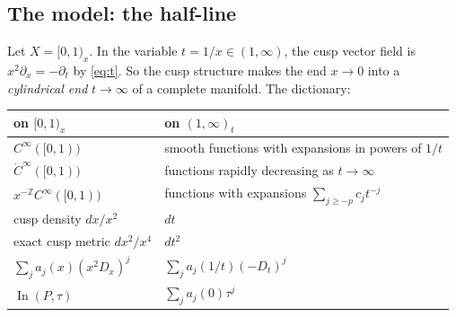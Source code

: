\documentclass[11pt,oneside,reqno]{article}
\DeclareMathOperator{\In}{In}
\newcommand{\Z}{\mathbb Z}
\newcommand{\CI}{C^\infty}
\newcommand{\dCI}{\dot C^\infty}
\theoremstyle{plain}
\theoremstyle{definition}
\theoremstyle{remark}
\begin{document}
\subsection{The model: the half-line}\label{subsec:halfline}
Let \(X=[0,1)_x\). In the variable \(t=1/x\in(1,\infty)\), the cusp vector
field is \(x^2\partial_x=-\partial_t\) by \eqref{eq:t}. So the cusp
structure makes the end \(x\to0\) into a \emph{cylindrical end}
\(t\to\infty\) of a complete manifold. The dictionary:
\begin{center}
\renewcommand{\arraystretch}{1.25}
\begin{tabular}{ll}
 on \([0,1)_x\) & on \((1,\infty)_t\)\\\hline
 \(\CI([0,1))\) & smooth functions with expansions in powers of \(1/t\)\\
 \(\dCI([0,1))\) & functions rapidly decreasing as \(t\to\infty\)\\
 \(x^{-\Z}\CI([0,1))\) & functions with expansions \(\sum_{j\ge-p}c_jt^{-j}\)\\
 cusp density \(dx/x^2\) & \(dt\)\\
 exact cusp metric \(dx^2/x^4\) & \(dt^2\)\\
 \(\sum_ja_j(x)(x^2D_x)^j\) & \(\sum_ja_j(1/t)(-D_t)^j\)\\
 \(\In(P,\tau)\) & \(\sum_ja_j(0)\tau^j\)\\
\end{tabular}
\end{center}
\end{document}

